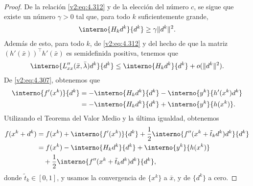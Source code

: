 \begin{proof}
De la relación \eqref{v2:eq:4.312} y de la elección del número $c$, se sigue que existe un número $\gamma > 0$ tal que, para todo $k$ suficientemente grande,
\begin{equation}
\interno{H_k d^k}{d^k} \ge \gamma \|d^k\|^2.
\label{v2:eq:4.314}
\end{equation}
Además de esto, para todo $k$, de \eqref{v2:eq:4.312} y del hecho de que la matriz $(h'(\bar{x}))^\top h'(\bar{x})$ es semidefinida positiva, tenemos que
\begin{equation}
\interno{L''_{xx}(\bar{x}, \bar{\lambda})d^k}{d^k} \le \interno{H_k d^k}{d^k} + o(\|d^k\|^2).
\label{v2:eq:4.315}
\end{equation}
De \eqref{v2:eq:4.307}, obtenemos que
\begin{align*}
\interno{f'(x^k)}{d^k} &= -\interno{H_k d^k}{d^k} - \interno{y^k}{h'(x^k)d^k} \\
&= -\interno{H_k d^k}{d^k} + \interno{y^k}{h(x^k)}.
\end{align*}
Utilizando el Teorema del Valor Medio y la última igualdad, obtenemos
\begin{align}
f(x^k + d^k) &= f(x^k) + \interno{f'(x^k)}{d^k} + \frac{1}{2}\interno{f''(x^k + \tilde{t}_k d^k)d^k}{d^k} \nonumber \\
&= f(x^k) - \interno{H_k d^k}{d^k} + \interno{y^k}{h(x^k)} \nonumber \\
&\quad + \frac{1}{2}\interno{f''(x^k + \tilde{t}_k d^k)d^k}{d^k},
\label{v2:eq:4.316}
\end{align}
donde $\tilde{t}_k \in [0, 1]$, y usamos la convergencia de $\{x^k\}$ a $\bar{x}$, y de $\{d^k\}$ a cero.


\end{proof}
